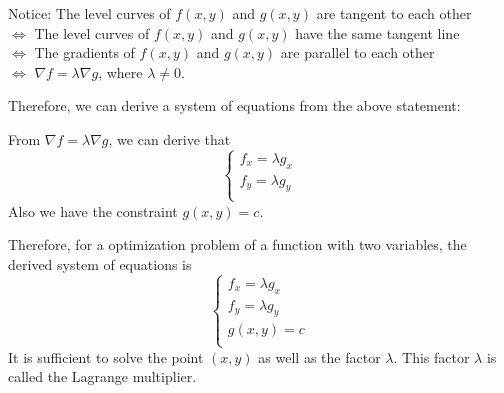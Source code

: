 \documentclass{article}
\begin{document}
Notice: The level curves of $f(x, y)$ and $g(x, y)$ are tangent to each other \\
$\iff$ The level curves of $f(x, y)$ and $g(x, y)$ have the same tangent line \\
$\iff$ The gradients of $f(x, y)$ and $g(x, y)$ are parallel to each other \\
$\iff$ $\nabla f = \lambda \nabla g$, where $\lambda \neq 0$.

Therefore, we can derive a system of equations from the above statement:

From $\nabla f = \lambda \nabla g$, we can derive that
\begin{equation*}
  \begin{cases}
    f_x = \lambda g_x \\
    f_y = \lambda g_y \\
  \end{cases}
\end{equation*}
Also we have the constraint $g(x, y) = c$.

Therefore, for a optimization problem of a function with two variables, the 
derived system of equations is
\begin{equation*}
  \begin{cases}
    f_x = \lambda g_x \\
    f_y = \lambda g_y \\
    g(x, y) = c \\
  \end{cases}
\end{equation*}
It is sufficient to solve the point $(x, y)$ as well as the factor $\lambda$. 
This factor $\lambda$ is called the Lagrange multiplier.
\end{document}
